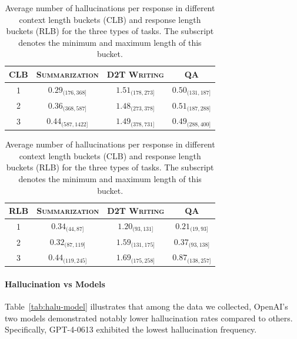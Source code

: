 \documentclass[11pt]{article}
\begin{document}
\begin{table}[!t]
\scriptsize
\centering
    \begin{tabular}{c|ccc}
    \toprule
    CLB & \textsc{Summarization} & \textsc{D2T Writing} & \textsc{QA}\\
    \midrule
     1 &  $0.29_{(176,368]}$ & $1.51_{(178,273]}$ & $0.50_{(131,187]}$ \\
     2 &  $0.36_{(368,587]}$ & $1.48_{(273,378]}$ & $0.51_{(187,288]}$ \\
     3 &  $0.44_{(587,1422]}$ & $1.49_{(378,731]}$ & $0.49_{(288,400]}$ \\
    \bottomrule
    \end{tabular}
    \begin{tabular}{c|ccc}
    \toprule
    RLB & \textsc{Summarization} & \textsc{D2T Writing} & \textsc{QA}\\
    \midrule
     1 &  $0.34_{(44,87]}$ & $1.20_{(93,131]}$ & $0.21_{(19,93]}$ \\
     2 &  $0.32_{(87,119]}$ & $1.59_{(131,175]}$ & $0.37_{(93,138]}$ \\
     3 &  $0.44_{(119,245]}$ & $1.69_{(175,258]}$ & $0.87_{(138,257]}$ \\
    \bottomrule
    \end{tabular}
    \caption{Average number of hallucinations per response in different context length buckets (CLB) and response length buckets (RLB) for the three types of tasks. The subscript denotes the minimum and maximum length of this bucket.}
    \label{tab:cl-vs-halu}
\end{table}


\paragraph{Hallucination vs Models} Table~\ref{tab:halu-model} illustrates that among the data we collected, OpenAI's two models demonstrated notably lower hallucination rates compared to others. Specifically, GPT-4-0613 exhibited the lowest hallucination frequency. 
\end{document}
